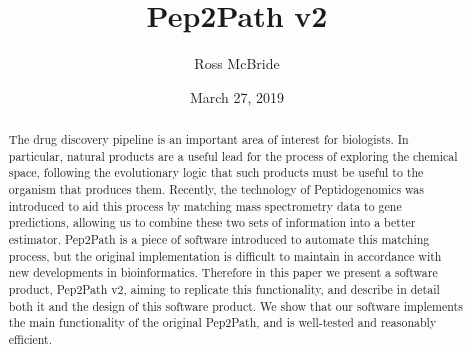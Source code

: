 \documentclass{l4proj}
\begin{document}
\title{Pep2Path v2}
\author{Ross McBride}
\date{March 27, 2019}

\maketitle

\begin{abstract}

The drug discovery pipeline is an important area of interest for biologists. In particular, natural products are a useful lead for the process of exploring the chemical space, following the evolutionary logic that such products must be useful to the organism that produces them. Recently, the technology of Peptidogenomics was introduced to aid this process by matching mass spectrometry data to gene predictions, allowing us to combine these two sets of information into a better estimator. Pep2Path is a piece of software introduced to automate this matching process, but the original implementation is difficult to maintain in accordance with new developments in bioinformatics. Therefore in this paper we present a software product, Pep2Path v2, aiming to replicate this functionality, and describe in detail both it and the design of this software product. We show that our software implements the main functionality of the original Pep2Path, and is well-tested and reasonably efficient.

\end{abstract}


%
%
\def\consentname {Ross McBride} %
\def\consentdate {27 March 2019} %
%
\educationalconsent


\tableofcontents
\end{document}
